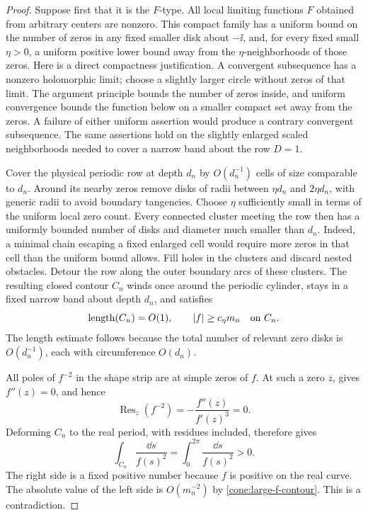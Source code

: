 \begin{proof}
Suppose first that it is the \(F\)-type. All local limiting functions
\(F\) obtained from arbitrary centers are nonzero. This compact family
has a uniform bound on the number of zeros in any fixed smaller disk
about \(-\ii\), and, for every fixed small \(\eta>0\), a uniform
positive lower bound away from the \(\eta\)-neighborhoods of those
zeros. Here is a direct compactness justification. A convergent
subsequence has a nonzero holomorphic limit; choose a slightly larger
circle without zeros of that limit. The argument principle bounds the
number of zeros inside, and uniform convergence bounds the function
below on a smaller compact set away from the zeros. A failure of
either uniform assertion would produce a contrary convergent
subsequence. The same assertions hold on the slightly enlarged scaled
neighborhoods needed to cover a narrow band about the row \(D=1\).

Cover the physical periodic row at depth \(d_n\) by \(O(d_n^{-1})\)
cells of size comparable to \(d_n\). Around its nearby zeros remove
disks of radii between \(\eta d_n\) and \(2\eta d_n\), with generic
radii to avoid boundary tangencies. Choose \(\eta\) sufficiently small
in terms of the uniform local zero count. Every connected cluster
meeting the row then has a uniformly bounded number of disks and
diameter much smaller than \(d_n\). Indeed, a minimal chain escaping a
fixed enlarged cell would require more zeros in that cell than the
uniform bound allows. Fill holes in the clusters and discard nested
obstacles. Detour the row along the outer boundary arcs of these
clusters. The resulting closed contour \(C_n\) winds once around the
periodic cylinder, stays in a fixed narrow band about depth \(d_n\),
and satisfies
\begin{equation}\label{cone:large-f-contour}
 \operatorname{length}(C_n)=O(1),\qquad
 |f|\ge c_\eta m_n\quad\hbox{on }C_n.
\end{equation}
The length estimate follows because the total number of relevant
zero disks is \(O(d_n^{-1})\), each with circumference \(O(d_n)\).

All poles of \(f^{-2}\) in the shape strip are at simple zeros of
\(f\). At such a zero \(z\),  gives
\(f''(z)=0\), and hence
\[
 \operatorname{Res}_{z}(f^{-2})
 =-\frac{f''(z)}{f'(z)^3}=0.
\]
Deforming \(C_n\) to the real period, with residues included, therefore
gives
\[
 \int_{C_n}\frac{\dd s}{f(s)^2}
 =\int_0^{2\pi}\frac{\dd s}{f(s)^2}>0.
\]
The right side is a fixed positive number because \(f\) is positive on
the real curve. The absolute value of the left side is
\(O(m_n^{-2})\) by \eqref{cone:large-f-contour}. This is a
contradiction.


\end{proof}
